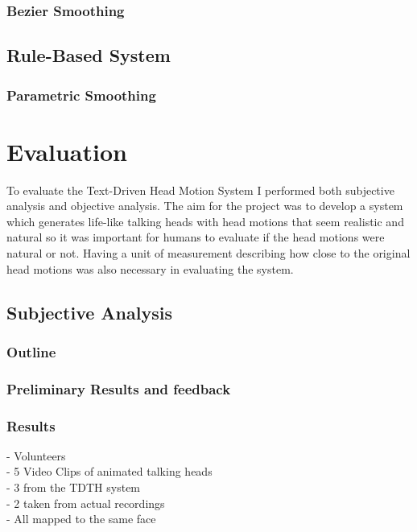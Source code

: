 \documentclass[bsc,frontabs,twoside,singlespacing,parskip]{infthesis}
\begin{document}
\subsection{Bezier Smoothing}

\section{Rule-Based System}
\subsection{Parametric Smoothing}
	
\chapter{Evaluation}

To evaluate the Text-Driven Head Motion System I performed both subjective analysis and objective analysis. The aim for the project was to develop a system which generates life-like talking heads with head motions that seem realistic and natural so it was important for humans to evaluate if the head motions were natural or not. Having a unit of measurement describing how close to the original head motions was also necessary in evaluating the system.

\section{Subjective Analysis}

\subsection{Outline}

\subsection{Preliminary Results and feedback}

\subsection{Results}

- Volunteers\\
- 5 Video Clips of animated talking heads \\
- 3 from the TDTH system\\
- 2 taken from actual recordings \\
- All mapped to the same face \\
\end{document}
